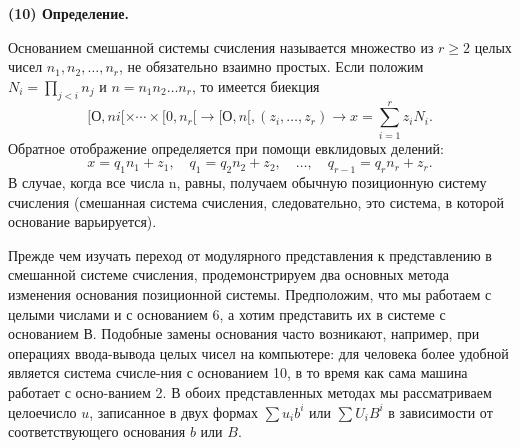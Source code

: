 \textbf{(10) Определение.}
\vspace{2mm}
\par
Основанием смешанной системы счисления называется множество \linebreak
из $r\geq2$ целых чисел $n_1, n_2,\ldots, n_r$, не обязательно взаимно простых.\linebreak
Если положим $N_i = \prod_{j<i}n_j$ и $n=n_1 n_2\ldots n_r$, то имеется биекция
$$[О, ni[\times \cdots \times [0, n_r[\rightarrow[О, n[, (z_i,\ldots, z_r)\rightarrow x = \sum\limits^{r}_{i=1}z_iN_i.$$
Обратное отображение определяется при помощи евклидовых делений:
$$x = q_1n_1 + z_1,\quad q_1 = q_2n_2 + z_2,\quad \ldots,\quad q_{r-1} = q_rn_r + z_r.$$
В случае, когда все числа n, равны, получаем обычную позиционную
систему счисления (смешанная система счисления, следовательно, это
система, в которой основание варьируется). 
\vspace{3mm}
\par
Прежде чем изучать переход от модулярного представления к 
представлению в смешанной системе счисления, продемонстрируем два 
основных метода изменения основания позиционной системы. 
Предположим, что мы работаем с целыми числами и с основанием 6, а хотим \linebreak
представить их в системе с основанием В. Подобные замены основания
часто возникают, например, при операциях ввода-вывода целых чисел \linebreak
на компьютере: для человека более удобной является система 
счисле-\linebreak ния с основанием 10, в то время как сама машина работает с 
осно-\linebreak ванием 2. В обоих представленных методах мы рассматриваем целое\linebreak число $u$, записанное в двух формах $\sum u_{i}b^{i}$ или $\sum U_{i}B^{i}$ в зависимости \linebreak
от соответствующего основания $b$ или $B$.

\newpage

